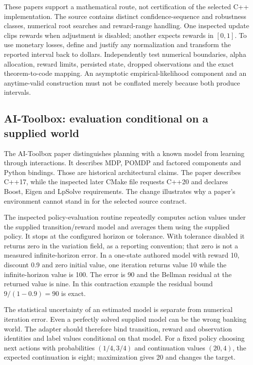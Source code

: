 These papers support a mathematical route, not certification of the selected C++ implementation. The source contains distinct confidence-sequence and robustness classes, numerical root searches and reward-range handling. One inspected update clips rewards when adjustment is disabled; another expects rewards in $[0,1]$. To use monetary losses, define and justify any normalization and transform the reported interval back to dollars. Independently test numerical boundaries, alpha allocation, reward limits, persisted state, dropped observations and the exact theorem-to-code mapping. An asymptotic empirical-likelihood component and an anytime-valid construction must not be conflated merely because both produce intervals.\citep{exec24_policycxx_vw,exec24_policycxx_cs2021,exec24_policycxx_anytime2024,exec24_policycxx_comparison}

\subsection{AI-Toolbox: evaluation conditional on a supplied world}
The AI-Toolbox paper distinguishes planning with a known model from learning through interactions. It describes MDP, POMDP and factored components and Python bindings. Those are historical architectural claims. The paper describes C++17, while the inspected later CMake file requests C++20 and declares Boost, Eigen and LpSolve requirements. The change illustrates why a paper's environment cannot stand in for the selected source contract.\citep{exec24_policycxx_aitoolbox_paper,exec24_policycxx_aitoolbox}

The inspected policy-evaluation routine repeatedly computes action values under the supplied transition/reward model and averages them using the supplied policy. It stops at the configured horizon or tolerance. With tolerance disabled it returns zero in the variation field, as a reporting convention; that zero is not a measured infinite-horizon error. In a one-state authored model with reward 10, discount 0.9 and zero initial value, one iteration returns value 10 while the infinite-horizon value is 100. The error is 90 and the Bellman residual at the returned value is nine. In this contraction example the residual bound $9/(1-0.9)=90$ is exact.\citep{exec24_policycxx_aitoolbox,exec24_policycxx_comparison}

The statistical uncertainty of an estimated model is separate from numerical iteration error. Even a perfectly solved supplied model can be the wrong banking world. The adapter should therefore bind transition, reward and observation identities and label values conditional on that model. For a fixed policy choosing next actions with probabilities $(1/4,3/4)$ and continuation values $(20,4)$, the expected continuation is eight; maximization gives 20 and changes the target.\citep{exec24_policycxx_comparison}

